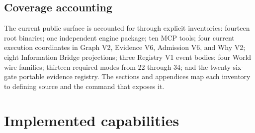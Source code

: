 \documentclass[11pt,oneside]{article}
\begin{document}
\subsection{Coverage accounting}

The current public surface is accounted for through explicit inventories:
fourteen root binaries; one independent engine package; ten MCP tools; four
current execution coordinates in Graph V2, Evidence V6, Admission V6, and Why
V2; eight Information Bridge projections; three Registry V1 event bodies; four
World wire families; thirteen required modes from 22 through 34; and the
twenty-six-gate portable evidence registry. The sections and appendices map
each inventory to defining source and the command that exposes it.

\section{Implemented capabilities}
\label{sec:claims}
\end{document}
